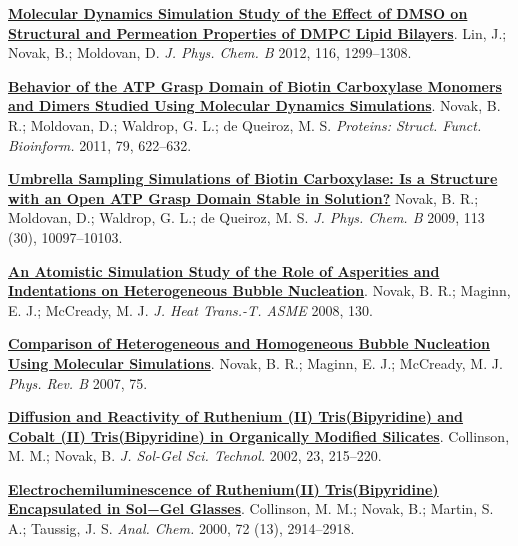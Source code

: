 \begin{cventries}
{\begin{cvitems}
        \item {\href{https://doi.org/10.1021/jp208145b}{\textbf{Molecular Dynamics Simulation Study of the Effect of DMSO on Structural and Permeation Properties of DMPC Lipid Bilayers}}. Lin, J.; Novak, B.; Moldovan, D. \textit{J. Phys. Chem. B} 2012, 116, 1299–1308.}
        \item {\href{https://doi.org/10.1002/prot.22910}{\textbf{Behavior of the ATP Grasp Domain of Biotin Carboxylase Monomers and Dimers Studied Using Molecular Dynamics Simulations}}. Novak, B. R.; Moldovan, D.; Waldrop, G. L.; de Queiroz, M. S. \textit{Proteins: Struct. Funct. Bioinform.} 2011, 79, 622–632.}
        \item{\href{https://doi.org/10.1021/jp810650q}{\textbf{Umbrella Sampling Simulations of Biotin Carboxylase: Is a Structure with an Open ATP Grasp Domain Stable in Solution?}} Novak, B. R.; Moldovan, D.; Waldrop, G. L.; de Queiroz, M. S. \textit{J. Phys. Chem. B} 2009, 113 (30), 10097–10103.}
        \item{\href{https://doi.org/10.1115/1.2818771}{\textbf{An Atomistic Simulation Study of the Role of Asperities and Indentations on Heterogeneous Bubble Nucleation}}. Novak, B. R.; Maginn, E. J.; McCready, M. J. \textit{J. Heat Trans.-T. ASME} 2008, 130.}
        \item{\href{https://doi.org/10.1103/PhysRevB.75.085413}{\textbf{Comparison of Heterogeneous and Homogeneous Bubble Nucleation Using Molecular Simulations}}. Novak, B. R.; Maginn, E. J.; McCready, M. J. \textit{Phys. Rev. B} 2007, 75. }
        \item{\href{https://doi.org/10.1023/A:1013966629311}{\textbf{Diffusion and Reactivity of Ruthenium (II) Tris(Bipyridine) and Cobalt (II) Tris(Bipyridine) in Organically Modified Silicates}}. Collinson, M. M.; Novak, B. \textit{J. Sol-Gel Sci. Technol.} 2002, 23, 215–220.}
        \item{\href{https://doi.org/10.1021/ac9913208}{\textbf{Electrochemiluminescence of Ruthenium(II) Tris(Bipyridine) Encapsulated in Sol−Gel Glasses}}. Collinson, M. M.; Novak, B.; Martin, S. A.; Taussig, J. S. \textit{Anal. Chem.} 2000, 72 (13), 2914–2918.}        
      \end{cvitems}
    }
    

\end{cventries}
